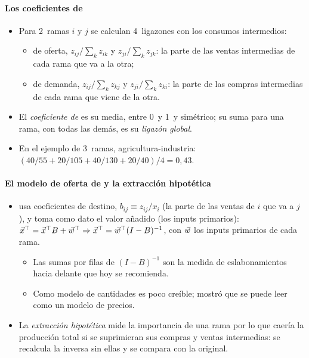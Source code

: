\documentclass[11pt]{article}
\begin{document}
\paragraph{Los coeficientes de }

\begin{itemize}
\item Para 2~ramas $i$ y $j$ se calculan 4~ligazones con los consumos intermedios:
  \begin{itemize}
  \item de oferta, $z_{ij}/\sum_k z_{ik}$ y $z_{ji}/\sum_k z_{jk}$: la parte de las ventas intermedias de cada rama que va a la otra;
  \item de demanda, $z_{ij}/\sum_k z_{kj}$ y $z_{ji}/\sum_k z_{ki}$: la parte de las compras intermedias de cada rama que viene de la otra.
  \end{itemize}
\item El \emph{coeficiente de } es su media, entre 0~y 1~y simétrico; su suma para una rama, con todas las demás, es su \emph{ligazón global}.
\item En el ejemplo de 3~ramas, agricultura-industria: $(40/55+20/105+40/130+20/40)/4=0{,}43$.
\end{itemize}

\paragraph{El modelo de oferta de  y la extracción hipotética}

\begin{itemize}
\item \textcite{Ghosh1958Input} usa coeficientes de destino, $b_{ij}\equiv z_{ij}/x_i$ (la parte de las ventas de $i$ que va a $j$), y toma como dato el valor añadido (los inputs primarios): $\vec{x}^{\top}=\vec{x}^{\top}B+\vec{w}^{\top}\Rightarrow\vec{x}^{\top}=\vec{w}^{\top}(I-B)^{-1}$, con $\vec{w}$ los inputs primarios de cada rama.
  \begin{itemize}
  \item Las sumas por filas de $(I-B)^{-1}$ son la medida de eslabonamientos hacia delante que hoy se recomienda\nocite{MillerBlair2022}.
  \item Como modelo de cantidades es poco creíble\nocite{Oosterhaven1988}; \textcite{Dietzenbacher1997} mostró que se puede leer como un modelo de precios.
  \end{itemize}
\item La \emph{extracción hipotética} mide la importancia de una rama por lo que caería la producción total si se suprimieran sus compras y ventas intermedias: se recalcula la inversa sin ellas y se compara con la original\nocite{MillerBlair2022}.
\end{itemize}
\end{document}
